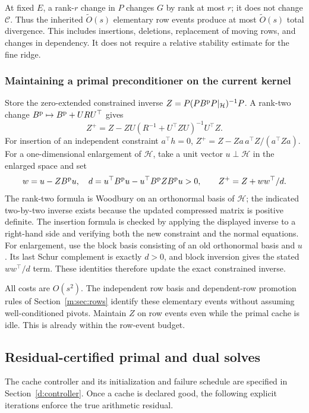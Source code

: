 \documentclass[11pt]{amsart}
\theoremstyle{definition}\newtheorem{definition}[theorem]{Definition}
\theoremstyle{remark}\newtheorem{remark}[theorem]{Remark}
\numberwithin{equation}{section}
\begin{document}
At fixed $E$, a rank-$r$ change in $P$ changes $G$ by rank at most $r$;
it does not change $\mathcal C$. Thus the inherited $\widetilde O(s)$ elementary row events
produce at most $\widetilde O(s)$ total divergence. This includes insertions,
deletions, replacement of moving rows, and changes in dependency. It does
not require a relative stability estimate for the fine ridge.

\subsubsection{Maintaining a primal preconditioner on the current kernel}
Store the zero-extended constrained inverse
$Z=P(PB^{\rm p}P|_{\mathcal H})^{-1}P$. A rank-two change
$B^{\rm p}\mapsto B^{\rm p}+URU^\top$ gives
\[
 Z^+=Z-ZU(R^{-1}+U^\top ZU)^{-1}U^\top Z.
\]
For insertion of an independent constraint $a^\top h=0$,
$Z^+=Z-Za\,a^\top Z/(a^\top Za)$.
For a one-dimensional enlargement of $\mathcal H$, take a unit vector
$u\perp\mathcal H$ in the enlarged space and set
\[
 w=u-ZB^{\rm p}u,\quad
 d=u^\top B^{\rm p}u-u^\top B^{\rm p}ZB^{\rm p}u>0,
 \qquad Z^+=Z+ww^\top/d.
\]
The rank-two formula is Woodbury on an orthonormal basis of $\mathcal H$;
the indicated two-by-two inverse exists because the updated compressed
matrix is positive definite. The insertion formula is checked by applying
the displayed inverse to a right-hand side and verifying both the new
constraint and the normal equations. For enlargement, use the block basis
consisting of an old orthonormal basis and $u$. Its last Schur complement
is exactly $d>0$, and block inversion gives the stated $ww^\top/d$ term.
These identities therefore update the exact constrained inverse.

All costs are $O(s^2)$. The independent row basis and dependent-row
promotion rules of Section~\ref{m:sec:rows} identify these elementary events without
assuming well-conditioned pivots. Maintain $Z$ on row events even while
the primal cache is idle. This is already within the row-event budget.

\subsection{Residual-certified primal and dual solves}\label{c:sec:solve}
The cache controller and its initialization and failure schedule are
specified in Section~\ref{d:controller}. Once a cache is declared good,
the following explicit iterations enforce the true arithmetic residual.
\end{document}
